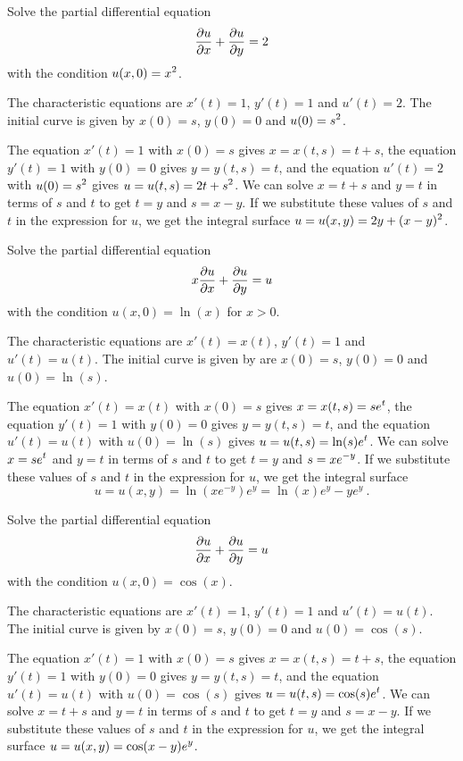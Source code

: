 \begin{egg}
Solve the partial differential equation
\[
\frac{\partial{u}}{\partial x} + \frac{\partial{u}}{\partial y} = 2
\]
with the condition $\displaystyle u(x,0)=x^2$.

The characteristic equations are $x'(t) = 1$, $y'(t) = 1$ and $u'(t) = 2$.
The initial curve is given by $x(0) = s$, $y(0) = 0$ and
$\displaystyle u(0) = s^2$.

The equation $x'(t) = 1$ with $x(0)=s$ gives $x = x(t,s) = t + s$,
the equation $y'(t) = 1$ with $y(0)=0$ gives $y = y(t,s) = t$, and
the equation $u'(t) = 2$ with $\displaystyle u(0)=s^2$ gives
$\displaystyle u = u(t,s) = 2t+s^2$.
We can solve $x = t+s$ and $y=t$ in terms of $s$ and $t$ to get
$t=y$ and $s= x-y$.  If we substitute these values of $s$ and $t$ in the
expression for $u$, we get the integral surface
$\displaystyle u= u(x,y) = 2y + (x-y)^2$.
\end{egg}

\begin{egg}
Solve the partial differential equation
\[
x \frac{\partial{u}}{\partial x} + \frac{\partial{u}}{\partial y} = u
\]
with the condition $u(x,0)=\ln(x)$ for $x>0$.

The characteristic equations are $x'(t) = x(t)$, $y'(t) = 1$ and
$u'(t) = u(t)$.  The initial curve is given by are
$x(0) = s$, $y(0) = 0$ and $u(0) = \ln(s)$.

The equation $x'(t) = x(t)$ with $x(0)=s$ gives
$\displaystyle x = x(t,s) = s e^t$,
the equation $y'(t) = 1$ with $y(0)=0$ gives $y = y(t,s) = t$, and
the equation $u'(t) = u(t)$ with $u(0)=\ln(s)$ gives
$\displaystyle u = u(t,s) = \ln(s)e^t$.
We can solve $\displaystyle x = se^t$ and $y=t$ in terms of $s$ and $t$ to get
$t=y$ and $\displaystyle s= xe^{-y}$.  If we substitute these values
of $s$ and $t$ in the expression for $u$, we get the integral surface
\[
u= u(x,y) = \ln(xe^{-y}) e^y = \ln(x) e^y -y e^y \ .
\]
\end{egg}

\begin{egg}
Solve the partial differential equation
\[
\frac{\partial{u}}{\partial x} + \frac{\partial{u}}{\partial y} = u
\]
with the condition $u(x,0)=\cos(x)$.

The characteristic equations are $x'(t) = 1$, $y'(t) = 1$ and $u'(t) = u(t)$.
The initial curve is given by $x(0) = s$, $y(0) = 0$ and $u(0) = \cos(s)$.

The equation $x'(t) = 1$ with $x(0)=s$ gives $x = x(t,s) = t + s$,
the equation $y'(t) = 1$ with $y(0)=0$ gives $y = y(t,s) = t$, and
the equation $u'(t) = u(t)$ with $u(0)=\cos(s)$ gives
$\displaystyle u = u(t,s) = \cos(s)e^t$.
We can solve $x = t+s$ and $y=t$ in terms of $s$ and $t$ to get
$t=y$ and $s= x-y$.  If we substitute these values of $s$ and $t$ in the
expression for $u$, we get the integral surface
$\displaystyle u= u(x,y) = \cos(x-y) e^y$.
\end{egg}

